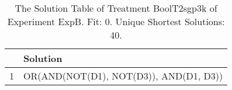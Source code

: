 \begin{table}[ht]
\centering
\begin{tabular}{rp{9cm}}
  \hline
 & Solution \\ 
  \hline
1 & OR(AND(NOT(D1), NOT(D3)), AND(D1, D3)) \\ 
   \hline
\end{tabular}
\caption{The Solution Table of Treatment BoolT2sgp3k of Experiment ExpB. Fit: 0. Unique Shortest Solutions: 40.} 
\end{table}
